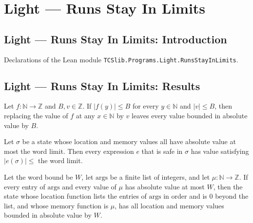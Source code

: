\section{Light --- Runs Stay In Limits}
\subsection*{Light --- Runs Stay In Limits: Introduction}

Declarations of the Lean module \texttt{TCSlib.Programs.Light.RunsStayInLimits}.

\subsection*{Light --- Runs Stay In Limits: Results}

\begin{theorem}
\label{Light.abs_update_le}
\leanok
{}
Let $f:\mathbb N\to\mathbb Z$ and $B,v\in\mathbb Z$. If $|f(y)|\le B$ for every
$y\in\mathbb N$ and $|v|\le B$, then replacing the value of $f$ at any $x\in\mathbb N$
by $v$ leaves every value bounded in absolute value by $B$.
\end{theorem}

\begin{theorem}
\label{Light.Expr.abs_val_le}
\leanok
{}
Let $\sigma$ be a state whose location and memory values all have absolute value at most
the word limit. Then every expression $e$ that is safe in $\sigma$ has value satisfying
$|e(\sigma)|\le$ the word limit.
\end{theorem}

\begin{theorem}
\label{Light.bounded_frame}
\leanok
{}
Let the word bound be $W$, let $\text{args}$ be a finite list of integers, and let
$\mu:\mathbb N\to\mathbb Z$. If every entry of $\text{args}$ and every value of $\mu$
has absolute value at most $W$, then the state whose location function lists the entries
of $\text{args}$ in order and is $0$ beyond the list, and whose memory function is
$\mu$, has all location and memory values bounded in absolute value by $W$.
\end{theorem}

